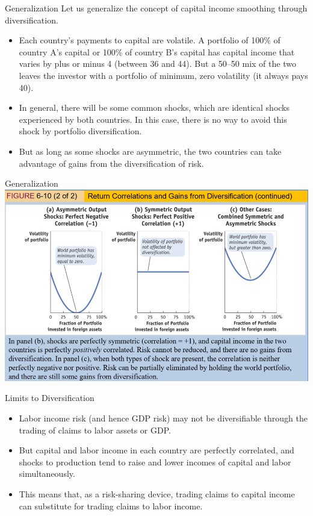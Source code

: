 \documentclass[
  ignorenonframetext,
]{beamer}
\begin{document}
\begin{frame}{Generalization}
\label{generalization}
Let us generalize the concept of capital income smoothing through
diversification.

\begin{itemize}
\item
  Each country's payments to capital are volatile. A portfolio of 100\%
  of country A's capital or 100\% of country B's capital has capital
  income that varies by plus or minus 4 (between 36 and 44). But a
  50--50 mix of the two leaves the investor with a portfolio of minimum,
  zero volatility (it always pays 40).
\item
  In general, there will be some common shocks, which are identical
  shocks experienced by both countries. In this case, there is no way to
  avoid this shock by portfolio diversification.
\item
  But as long as some shocks are asymmetric, the two countries can take
  advantage of gains from the diversification of risk.
\end{itemize}
\end{frame}

\begin{frame}{Generalization}
\label{generalization-1}
\includegraphics{pic9.png}
\end{frame}

\begin{frame}{Limits to Diversification}
\label{limits-to-diversification}
\begin{itemize}
\item
  Labor income risk (and hence GDP risk) may not be diversifiable
  through the trading of claims to labor assets or GDP.
\item
  But capital and labor income in each country are perfectly correlated,
  and shocks to production tend to raise and lower incomes of capital
  and labor simultaneously.
\item
  This means that, as a risk-sharing device, trading claims to capital
  income can substitute for trading claims to labor income.
\end{itemize}
\end{frame}
\end{document}
